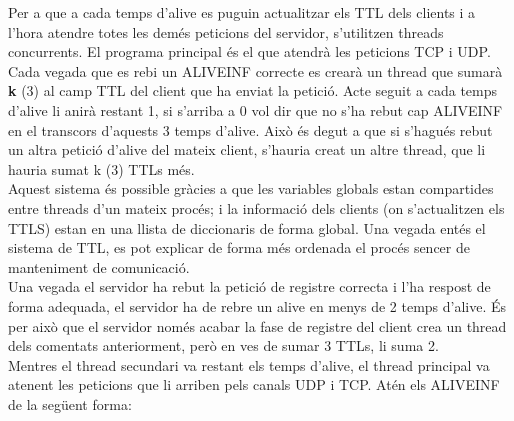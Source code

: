 \documentclass{article}
\begin{document}
Per a que a cada temps d'alive es puguin actualitzar els TTL dels clients i a l'hora
atendre totes les demés peticions del servidor, s'utilitzen threads concurrents. El
programa principal és el que atendrà les peticions TCP i UDP. Cada vegada que es rebi
un ALIVE\textunderscore INF correcte es crearà un thread que sumarà \textbf{k} (3) al
camp TTL del client que ha enviat la petició. Acte seguit a cada temps d'alive li anirà
restant 1, si s'arriba a 0 vol dir que no s'ha rebut cap ALIVE\textunderscore INF en el
transcors d'aquests 3 temps d'alive. Això és degut a que si s'hagués rebut un altra 
petició d'alive del mateix client, s'hauria creat un altre thread, que li hauria 
sumat k (3) TTLs més.\\

Aquest sistema és possible gràcies a que les variables 
globals estan compartides entre
threads d'un mateix procés; i la informació dels clients (on s'actualitzen els
TTLS) estan en una llista de diccionaris de forma global. Una vegada entés 
el sistema de TTL, es pot explicar de forma més ordenada el procés sencer 
de manteniment de comunicació.\\

Una vegada el servidor ha rebut la petició de registre correcta i l'ha respost 
de forma adequada, el servidor ha de rebre un alive en menys de 2 temps d'alive. 
És per això que el servidor només acabar la fase de registre del client crea 
un thread dels comentats anteriorment, però en ves de sumar 3 TTLs, li suma 2.\\

Mentres el thread secundari va restant els temps d'alive, el thread principal va
atenent les peticions que li arriben pels canals UDP i TCP. Atén els 
ALIVE\textunderscore INF de la següent forma:
\end{document}
